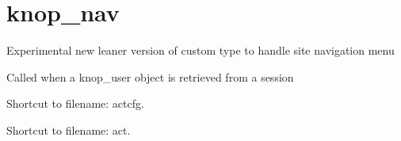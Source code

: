 \documentclass[letterpaper,10pt,english]{sphinxmanual}
\begin{document}
\chapter{knop\_nav}
\label{knop_nav::doc}\label{knop_nav:knop-nav}

\begin{fulllineitems}
\label{knop_nav:knop_nav}
Experimental new leaner version of custom type to handle site navigation menu

\begin{fulllineitems}
\label{knop_nav:knop_nav.acceptDeserializedElement}
Called when a knop\_user object is retrieved from a session

\end{fulllineitems}


\begin{fulllineitems}
\label{knop_nav:knop_nav.actionconfigfile}
Shortcut to filename: actcfg.

\end{fulllineitems}


\begin{fulllineitems}
\label{knop_nav:knop_nav.actionconfigfile_didrun}
\end{fulllineitems}



\begin{fulllineitems}
\end{fulllineitems}


\begin{fulllineitems}
\label{knop_nav:knop_nav.actionfile}
Shortcut to filename: act.

\end{fulllineitems}



\end{fulllineitems}
\end{document}
